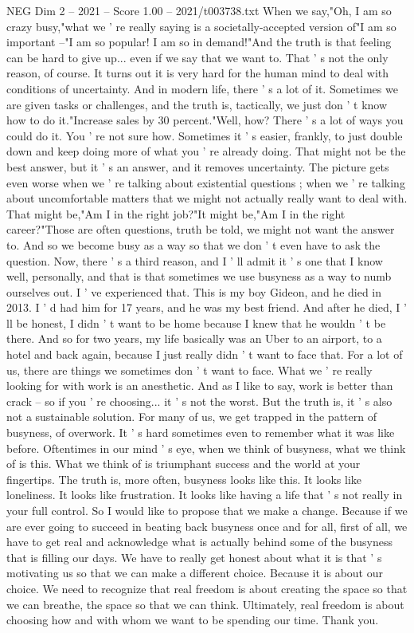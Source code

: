 \begin{textsample}{NEG Dim 2 – 2021 – Score 1.00 – 2021/t003738.txt}
When we say,"Oh, I am so crazy busy,"what we ' re really saying is a societally-accepted version of"I am so important --"I am so popular!
I am so in demand!"And the truth is that feeling can be hard to give up... even if we say that we want to.
That ' s not the only reason, of course.
It turns out it is very hard for the human mind to deal with conditions of uncertainty.
And in modern life, there ' s a lot of it.
Sometimes we are given tasks or challenges, and the truth is, tactically, we just don ' t know how to do it."Increase sales by 30 percent."Well, how?
There ' s a lot of ways you could do it.
You ' re not sure how.
Sometimes it ' s easier, frankly, to just double down and keep doing more of what you ' re already doing.
That might not be the best answer, but it ' s an answer, and it removes uncertainty.
The picture gets even worse when we ' re talking about existential questions ; when we ' re talking about uncomfortable matters that we might not actually really want to deal with.
That might be,"Am I in the right job?"It might be,"Am I in the right career?"Those are often questions, truth be told, we might not want the answer to.
And so we become busy as a way so that we don ' t even have to ask the question.
Now, there ' s a third reason, and I ' ll admit it ' s one that I know well, personally, and that is that sometimes we use busyness as a way to numb ourselves out.
I ' ve experienced that.
This is my boy Gideon, and he died in 2013.
I ' d had him for 17 years, and he was my best friend.
And after he died, I ' ll be honest, I didn ' t want to be home because I knew that he wouldn ' t be there.
And so for two years, my life basically was an Uber to an airport, to a hotel and back again, because I just really didn ' t want to face that.
For a lot of us, there are things we sometimes don ' t want to face.
What we ' re really looking for with work is an anesthetic.
And as I like to say, work is better than crack -- so if you ' re choosing... it ' s not the worst.
But the truth is, it ' s also not a sustainable solution.
For many of us, we get trapped in the pattern of busyness, of overwork.
It ' s hard sometimes even to remember what it was like before.
Oftentimes in our mind ' s eye, when we think of busyness, what we think of is this.
What we think of is triumphant success and the world at your fingertips.
The truth is, more often, busyness looks like this.
It looks like loneliness.
It looks like frustration.
It looks like having a life that ' s not really in your full control.
So I would like to propose that we make a change.
Because if we are ever going to succeed in beating back busyness once and for all, first of all, we have to get real and acknowledge what is actually behind some of the busyness that is filling our days.
We have to really get honest about what it is that ' s motivating us so that we can make a different choice.
Because it is about our choice.
We need to recognize that real freedom is about creating the space so that we can breathe, the space so that we can think.
Ultimately, real freedom is about choosing how and with whom we want to be spending our time.
Thank you.

\end{textsample}
